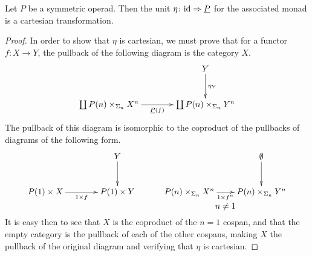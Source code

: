 \begin{prop}\label{cart_unit}
Let $P$ be a symmetric operad. Then the unit $\eta \colon \textrm{id} \Rightarrow \underline{P}$ for the associated monad is a cartesian transformation.
\end{prop}
\begin{proof}
In order to show that $\eta$ is cartesian, we must prove that for a functor $f \colon X \rightarrow Y$, the pullback of the following diagram is the category $X$.
	\[
		\xy
			(40,0)*+{Y}="10";
			(0,-15)*+{\coprod P(n) \times_{\Sigma_n} X^n}="01";
			(40,-15)*+{\coprod P(n) \times_{\Sigma_n} Y^n}="11";
			{\ar^{\eta_Y} "10" ; "11"};
			{\ar_{\underline{P}(f)} "01" ; "11"};
		\endxy
	\]
The pullback of this diagram is isomorphic to the coproduct of the pullbacks of diagrams of the following form.
\[
		\xy
			(30,0)*+{Y}="10";
			(0,-15)*+{P(1) \times X}="01";
			(30,-15)*+{P(1) \times Y}="11";
			{\ar^{} "10" ; "11"};
			{\ar_{1 \times f} "01" ; "11"};
			(90,0)*+{\emptyset}="60";
			(60,-15)*+{P(n) \times_{\Sigma_{n}} X^n}="51";
			(90,-15)*+{P(n) \times_{\Sigma_{n}} Y^n}="61";
			{\ar^{} "60" ; "61"};
			{\ar_{1 \times f^n} "51" ; "61"};
			(75,-21)*{n \neq 1}
		\endxy
	\]
It is easy then to see that $X$ is the coproduct of the $n=1$ cospan, and that the empty category is the pullback of each of the other cospans, making $X$ the pullback of the original diagram and verifying that $\eta$ is cartesian.
\end{proof}


